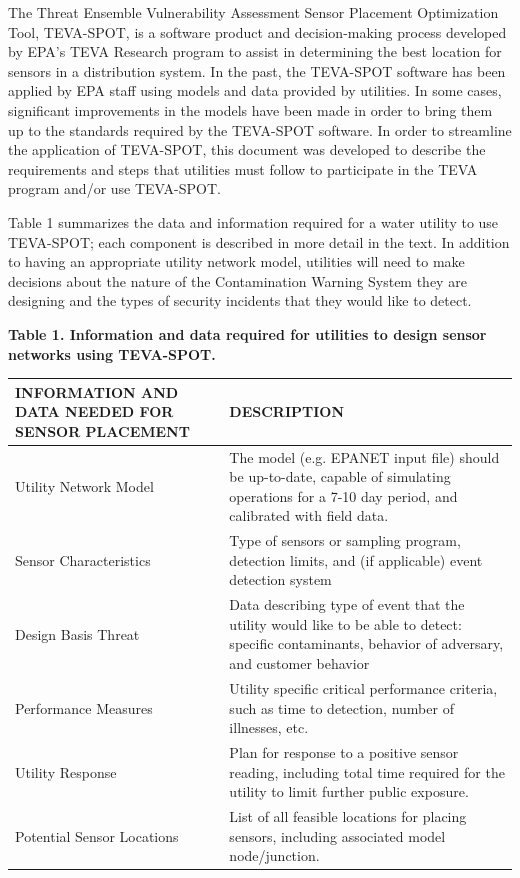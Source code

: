 The Threat Ensemble Vulnerability Assessment Sensor Placement Optimization Tool, TEVA-SPOT, is a software product and decision-making process developed by EPA's TEVA Research program to assist in determining the best location for sensors in a distribution system. In the past, the TEVA-SPOT software has been applied by EPA staff using models and data provided by utilities. In some cases, significant improvements in the models have been made in order to bring them up to the standards required by the TEVA-SPOT software.  In order to streamline the application of TEVA-SPOT, this document was developed to describe the requirements and steps that utilities must follow to participate in the TEVA program and/or use TEVA-SPOT.  

Table 1 summarizes the data and information required for a water utility to use TEVA-SPOT; each component is described in more detail in the text.  In addition to having an appropriate utility network model, utilities will need to make decisions about the nature of the Contamination Warning System they are designing and the types of security incidents that they would like to detect.

{\bf Table 1.  Information and data required for utilities to design sensor networks using TEVA-SPOT.}
\begin{center}
  \begin{tabular}{ | p{5cm} | p{10cm} | }
    \hline
    INFORMATION AND DATA NEEDED FOR SENSOR PLACEMENT & DESCRIPTION  \\ \hline
    Utility Network Model  & The model (e.g. EPANET input file) should be up-to-date, capable of simulating operations for a 7-10 day period, and calibrated with field data.  \\ \hline
    Sensor Characteristics & Type of sensors or sampling program, detection limits, and (if applicable) event detection system \\ \hline
    Design Basis Threat & Data describing type of event that the utility would like to be able to detect: specific contaminants, behavior of adversary, and customer behavior \\ \hline
    Performance Measures & Utility specific critical performance criteria, such as time to detection, number of illnesses, etc. \\ \hline
    Utility Response & Plan for response to a positive sensor reading, including total time required for the utility to limit further public exposure. \\ \hline
    Potential Sensor Locations & List of all feasible locations for placing sensors, including associated model node/junction. \\
    \hline
  \end{tabular}
\end{center}

